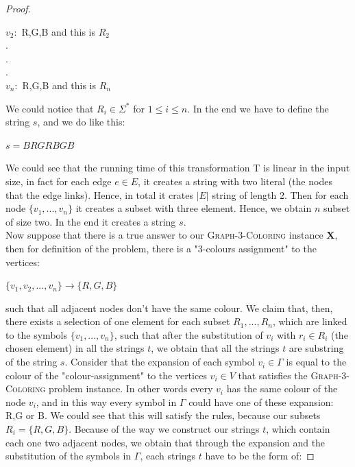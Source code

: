 \documentclass[paper=a4, fontsize=11pt]{scrartcl}
\numberwithin{equation}{section}		%
\numberwithin{figure}{section}			%
\numberwithin{table}{section}				%
\begin{document}
\begin{proof}
\begin{center}
     	$v_2:$ \textsc{R,G,B} and this is $R_2$ \\
     	$.$ \\
     	$.$ \\
     	$.$ \\
     	$v_n:$ \textsc{R,G,B} and this is $R_n$
     \end{center}
     We could notice that $R_i \in \Sigma^*$ for $1 \leq i \leq n$. \newline
     In the end we have to define the string $s$, and we do like this:
     \begin{center}
        $s=BRGRBGB$
     \end{center}	
     We could see that the running time of this transformation T is linear in the input size, in fact for each edge $e\in E$, it creates a string with two literal (the nodes that the edge links). Hence, in total it crates $|E|$ string of length 2. Then for each node $\{v_1,...,v_n\}$ it creates a subset with three element. Hence, we obtain $n$ subset of size two. In the end it creates a string $s$. \newline
     \\
     \noindent Now suppose that there is a true answer to our \textsc{Graph-3-Coloring} instance \textbf{X}, then for definition of the problem, there is a "3-colours assignment" to the vertices:
     \begin{center}
     	$\{v_1,v_2,...,v_n\} \rightarrow \{R,G,B\}$
     \end{center} 
     such that all adjacent nodes don't have the same colour. We claim that, then, there exists a selection of one element for each subset $R_1,...,R_n$, which are linked to the symbols $\{v_1,...,v_n\}$, such that after the substitution of $v_i$ with $r_i \in R_i$ (the chosen element) in all the strings $t$, we obtain that all the strings $t$ are substring of the string $s$. Consider that the expansion of each symbol $v_i \in \Gamma$ is equal to the colour of the "colour-assignment" to the vertices $v_i \in V$ that satisfies the \textsc{Graph-3-Coloring} problem instance. In other words every $v_i$ has the same colour of the node $v_i$, and in this way every symbol in $\Gamma$ could have one of these expansion: R,G or B. We could see that this will satisfy the rules, because our subsets $R_i = \{R,G,B\}$. \newline
     Because of the way we construct our strings $t$, which contain each one two adjacent nodes, we obtain that through the expansion and the substitution of the symbols in $\Gamma$, each strings $t$ have to be the form of:

\end{proof}
\end{document}
